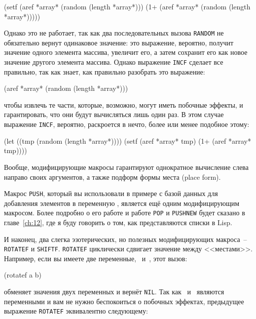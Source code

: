 \begin{myverb}
  (setf (aref *array* (random (length *array*)))
        (1+ (aref *array* (random (length *array*)))))
\end{myverb}

Однако это не работает, так как два последовательных вызова \lstinline{RANDOM} не
обязательно вернут одинаковое значение: это выражение, вероятно, получит значение одного
элемента массива, увеличит его, а затем сохранит его как новое значение другого элемента
массива. Однако выражение \lstinline{INCF} сделает все правильно, так как знает, как
правильно разобрать это выражение:

\begin{myverb}
  (aref *array* (random (length *array*)))
\end{myverb}

\noindent{}чтобы извлечь те части, которые, возможно, могут иметь побочные эффекты, и гарантировать,
что они будут вычисляться лишь один раз. В этом случае выражение \lstinline{INCF}, вероятно,
раскроется в нечто, более или менее подобное этому:

\begin{myverb}
  (let ((tmp (random (length *array*))))
    (setf (aref *array* tmp) (1+ (aref *array* tmp))))
\end{myverb}

Вообще, модифицирующие макросы гарантируют однократное вычисление слева направо своих
аргументов, а также подформ формы места (place form).

Макрос \lstinline{PUSH}, который вы использовали в примере с базой данных для добавления
элементов в переменную , является ещё одним модифицирующим макросом. Более подробно о
его работе и работе \lstinline{POP} и \lstinline{PUSHNEW} будет сказано в главе~\ref{ch:12}, где
я буду говорить о том, как представляются списки в Lisp.

И наконец, два слегка эзотерических, но полезных модифицирующих макроса~--
\lstinline{ROTATEF} и \lstinline{SHIFTF}. \lstinline{ROTATEF} циклически сдвигает значение между
<<местами>>. Например, если вы имеете две переменные, ~и~, этот вызов:

\begin{myverb}
  (rotatef a b)
\end{myverb}

\noindent{}обменяет значения двух переменных и вернёт \lstinline{NIL}. Так как
~и~ являются переменными и вам не нужно беспокоиться о побочных эффектах,
предыдущее выражение \lstinline{ROTATEF} эквивалентно следующему:

